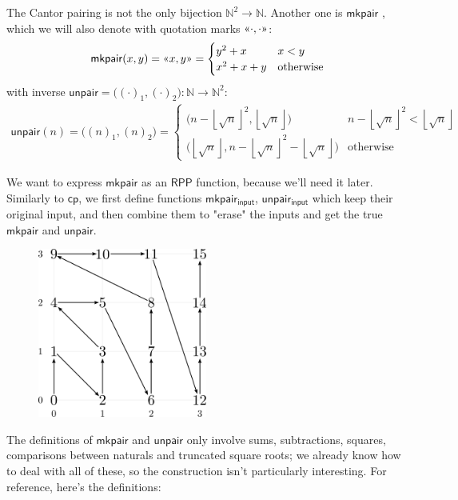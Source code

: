 \documentclass[oneside]{book}
\theoremstyle{definition}
\theoremstyle{remark}
\theoremstyle{plain}
\newcommand{\NN}{\mathbb{N}}
\newcommand{\floor}[1]{\left\lfloor #1 \right\rfloor}
\newcommand{\gl}{\text{\guillemotleft}}
\newcommand{\gr}{\text{\guillemotright}}
\newcommand{\RPP}{\mathsf{RPP}}
\newcommand{\rppcp}{\mathsf{cp}}
\newcommand{\rppmkpair}{\mathsf{mkpair}}
\newcommand{\rppmkpairi}{\mathsf{mkpair_{input}}}
\newcommand{\rppunpair}{\mathsf{unpair}}
\newcommand{\rppunpairi}{\mathsf{unpair_{input}}}
\begin{document}
The Cantor pairing is not the only bijection $\NN^2 \to \NN$.
Another one is $\rppmkpair$ \cite{Carneiro19}, which we will also denote with quotation marks $\gl \cdot, \cdot \gr$:
\[\rppmkpair(x,y) = \gl x,y \gr = \begin{cases} y^2 + x & x < y \\ x^2 + x + y & \text{otherwise} \end{cases} \]
with inverse $\rppunpair = \big( (\cdot)_1, (\cdot)_2 \big) : \NN \to \NN^2$:
\begin{align*}
  \rppunpair(n) = \big( (n)_1, (n)_2 \big) = \begin{cases} \big( n - \floor{\sqrt{n}}^2, \floor{\sqrt{n}} \big)                    & n - \floor{\sqrt{n}}^2 < \floor{\sqrt{n}} \\
                                                           \big( \floor{\sqrt{n}}, n - \floor{\sqrt{n}}^2 - \floor{\sqrt{n}} \big) & \text{otherwise} \end{cases}
\end{align*}

We want to express $\rppmkpair$ as an $\RPP$ function, because we'll need it later.
Similarly to $\rppcp$, we first define functions $\rppmkpairi$, $\rppunpairi$ which keep their original input,
and then combine them to "erase" the inputs and get the true $\rppmkpair$ and $\rppunpair$.

\begin{figure}[H]
  \centering
  \includegraphics[width=15em]{Immagini/mkpair.png}
\end{figure}

The definitions of $\rppmkpair$ and $\rppunpair$ only involve sums, subtractions, squares, comparisons between naturals and truncated square roots;
we already know how to deal with all of these, so the construction isn't particularly interesting.
For reference, here's the definitions:
\end{document}
